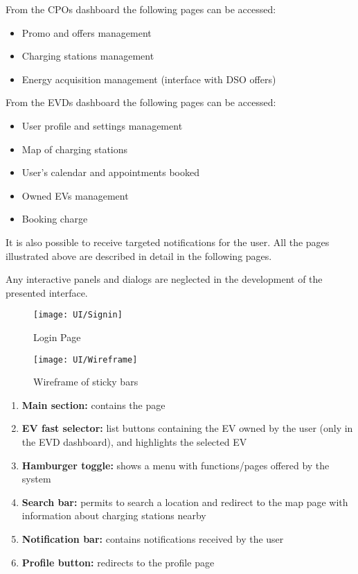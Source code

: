 From the CPOs dashboard the following pages can be accessed:

\begin{itemize}
    \item Promo and offers management
    \item Charging stations management
    \item Energy acquisition management (interface with DSO offers)
\end{itemize}

From the EVDs dashboard the following pages can be accessed:

\begin{itemize}
    \item User profile and settings management
    \item Map of charging stations
    \item User’s calendar and appointments booked
    \item Owned EVs management
    \item Booking charge
\end{itemize}

It is also possible to receive targeted notifications for the user.
All the pages illustrated above are described in detail in the following pages.

Any interactive panels and dialogs are neglected in the development of the presented interface.

\begin{figure} [H]
    \begin{center}
        \texttt{[image: UI/Signin]}
        \caption{Login Page}
        \label{fig: signin}
    \end{center}
\end{figure}

\begin{figure} [H]
    \begin{center}
        \texttt{[image: UI/Wireframe]}
        \caption{Wireframe of sticky bars}
        \label{fig: wireframe}
    \end{center}
\end{figure}

\begin{enumerate}
    \item \textbf{Main section:} contains the page
    \item \textbf{EV fast selector:} list buttons containing the EV owned by the user (only in the EVD dashboard), and highlights the selected EV
    \item \textbf{Hamburger toggle:} shows a menu with functions/pages offered by the system
    \item \textbf{Search bar:} permits to search a location and redirect to the map page with information about charging stations nearby
    \item \textbf{Notification bar:} contains notifications received by the user
    \item \textbf{Profile button:} redirects to the profile page
\end{enumerate}


